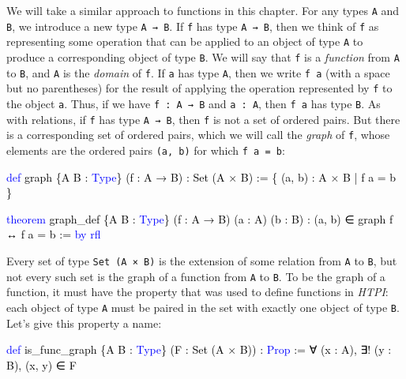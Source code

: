 \documentclass[
  letterpaper,
  DIV=11,
  numbers=noendperiod]{scrreprt}
\newenvironment{Shaded}{\begin{snugshade}}{\end{snugshade}}
\newcommand{\KeywordTok}[1]{\textcolor[rgb]{0.00,0.23,0.31}{#1}}
\newcommand{\NormalTok}[1]{\textcolor[rgb]{0.00,0.23,0.31}{#1}}
\renewcommand{\NormalTok}[1]{\textcolor[HTML]{000000}{#1}}
\renewcommand{\KeywordTok}[1]{\textcolor[HTML]{0000FF}{#1}}
\theoremstyle{remark}
\begin{document}
We will take a similar approach to functions in this chapter. For any
types \texttt{A} and \texttt{B}, we introduce a new type
\texttt{A\ →\ B}. If \texttt{f} has type \texttt{A\ →\ B}, then we think
of \texttt{f} as representing some operation that can be applied to an
object of type \texttt{A} to produce a corresponding object of type
\texttt{B}. We will say that \texttt{f} is a \emph{function} from
\texttt{A} to \texttt{B}, and \texttt{A} is the \emph{domain} of
\texttt{f}. If \texttt{a} has type \texttt{A}, then we write
\texttt{f\ a} (with a space but no parentheses) for the result of
applying the operation represented by \texttt{f} to the object
\texttt{a}. Thus, if we have \texttt{f\ :\ A\ →\ B} and
\texttt{a\ :\ A}, then \texttt{f\ a} has type \texttt{B}. As with
relations, if \texttt{f} has type \texttt{A\ →\ B}, then \texttt{f} is
not a set of ordered pairs. But there is a corresponding set of ordered
pairs, which we will call the \emph{graph} of \texttt{f}, whose elements
are the ordered pairs \texttt{(a,\ b)} for which \texttt{f\ a\ =\ b}:

\begin{Shaded}
\begin{Highlighting}[]
\KeywordTok{def}\NormalTok{ graph \{A B : }\KeywordTok{Type}\NormalTok{\} (f : A → B) : Set (A × B) :=}
\NormalTok{  \{ (a, b) : A × B | f a = b \}}

\KeywordTok{theorem}\NormalTok{ graph\_def \{A B : }\KeywordTok{Type}\NormalTok{\} (f : A → B) (a : A) (b : B) :}
\NormalTok{    (a, b) ∈ graph f ↔ f a = b := }\KeywordTok{by} \KeywordTok{rfl}
\end{Highlighting}
\end{Shaded}

Every set of type \texttt{Set\ (A\ ×\ B)} is the extension of some
relation from \texttt{A} to \texttt{B}, but not every such set is the
graph of a function from \texttt{A} to \texttt{B}. To be the graph of a
function, it must have the property that was used to define functions in
\emph{HTPI}: each object of type \texttt{A} must be paired in the set
with exactly one object of type \texttt{B}. Let's give this property a
name:

\begin{Shaded}
\begin{Highlighting}[]
\KeywordTok{def}\NormalTok{ is\_func\_graph \{A B : }\KeywordTok{Type}\NormalTok{\} (F : Set (A × B)) : }\KeywordTok{Prop}\NormalTok{ :=}
\NormalTok{  ∀ (x : A), ∃! (y : B), (x, y) ∈ F}
\end{Highlighting}
\end{Shaded}
\end{document}
